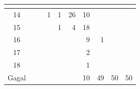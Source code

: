 \begin{minipage}[\minipagealign]{\minipagewidth}
{\begin{tabular}{|c|lllllllll|}
\multicolumn{1}{r|}{} & \multicolumn{1}{r|}{} & \\ \hline 14 & \multicolumn{1}{r|}{} & \multicolumn{1}{r|}{} & \multicolumn{1}{r|}{1} & \multicolumn{1}{r|}{1} & \multicolumn{1}{r|}{26} & \multicolumn{1}{r|}{10} & \multicolumn{1}{r|}{} & \multicolumn{1}{r|}{} & \\ \hline 15 & \multicolumn{1}{r|}{} & \multicolumn{1}{r|}{} & \multicolumn{1}{r|}{} & \multicolumn{1}{r|}{1} & \multicolumn{1}{r|}{4} & \multicolumn{1}{r|}{18} & \multicolumn{1}{r|}{} & \multicolumn{1}{r|}{} & \\ \hline 16 & \multicolumn{1}{r|}{} & \multicolumn{1}{r|}{} & \multicolumn{1}{r|}{} & \multicolumn{1}{r|}{} & \multicolumn{1}{r|}{} & \multicolumn{1}{r|}{9} & \multicolumn{1}{r|}{1} & \multicolumn{1}{r|}{} & \\ \hline 17 & \multicolumn{1}{r|}{} & \multicolumn{1}{r|}{} & \multicolumn{1}{r|}{} & \multicolumn{1}{r|}{} & \multicolumn{1}{r|}{} & \multicolumn{1}{r|}{2} & \multicolumn{1}{r|}{} & \multicolumn{1}{r|}{} & \\ \hline 18 & \multicolumn{1}{r|}{} & \multicolumn{1}{r|}{} & \multicolumn{1}{r|}{} & \multicolumn{1}{r|}{} & \multicolumn{1}{r|}{} & \multicolumn{1}{r|}{1} & \multicolumn{1}{r|}{} & \multicolumn{1}{r|}{} & \\ \hline Gagal & \multicolumn{1}{r|}{} & \multicolumn{1}{r|}{} & \multicolumn{1}{r|}{} & \multicolumn{1}{r|}{} & \multicolumn{1}{r|}{} & \multicolumn{1}{r|}{10} & \multicolumn{1}{r|}{49} & \multicolumn{1}{r|}{50} & 50 \\ \hline
		\end{tabular}
	}
\end{minipage}
